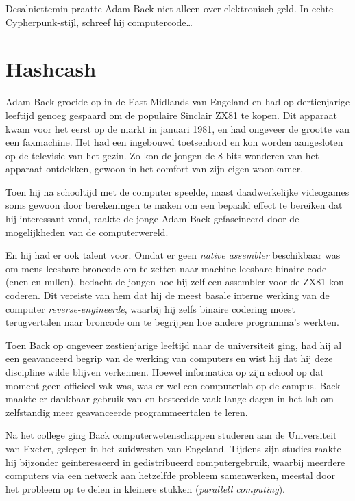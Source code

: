 \documentclass[
  a5paper,
  smalldemyvopaper,11pt,twoside,onecolumn,openright,extrafontsizes,
hidelinks]{memoir}
\begin{document}
Desalniettemin praatte Adam Back niet alleen over elektronisch geld. In
echte Cypherpunk-stijl, schreef hij computercode\ldots{}

\chapter{Hashcash}\label{hashcash}

Adam Back groeide op in de East Midlands van Engeland en had op
dertienjarige leeftijd genoeg gespaard om de populaire Sinclair ZX81 te
kopen. Dit apparaat kwam voor het eerst op de markt in januari 1981, en
had ongeveer de grootte van een faxmachine. Het had een ingebouwd
toetsenbord en kon worden aangesloten op de televisie van het gezin. Zo
kon de jongen de 8-bits wonderen van het apparaat ontdekken, gewoon in
het comfort van zijn eigen woonkamer.

Toen hij na schooltijd met de computer speelde, naast daadwerkelijke
videogames soms gewoon door berekeningen te maken om een bepaald effect
te bereiken dat hij interessant vond, raakte de jonge Adam Back
gefascineerd door de mogelijkheden van de computerwereld.

En hij had er ook talent voor. Omdat er geen \emph{native assembler}
beschikbaar was om mens-leesbare broncode om te zetten naar
machine-leesbare binaire code (enen en nullen), bedacht de jongen hoe
hij zelf een assembler voor de ZX81 kon coderen. Dit vereiste van hem
dat hij de meest basale interne werking van de computer
\emph{reverse-engineerde}, waarbij hij zelfs binaire codering moest
terugvertalen naar broncode om te begrijpen hoe andere programma's
werkten.

Toen Back op ongeveer zestienjarige leeftijd naar de universiteit ging,
had hij al een geavanceerd begrip van de werking van computers en wist
hij dat hij deze discipline wilde blijven verkennen. Hoewel informatica
op zijn school op dat moment geen officieel vak was, was er wel een
computerlab op de campus. Back maakte er dankbaar gebruik van en
besteedde vaak lange dagen in het lab om zelfstandig meer geavanceerde
programmeertalen te leren.

Na het college ging Back computerwetenschappen studeren aan de
Universiteit van Exeter, gelegen in het zuidwesten van Engeland. Tijdens
zijn studies raakte hij bijzonder geïnteresseerd in gedistribueerd
computergebruik, waarbij meerdere computers via een netwerk aan
hetzelfde probleem samenwerken, meestal door het probleem op te delen in
kleinere stukken (\emph{parallell computing}).
\end{document}
